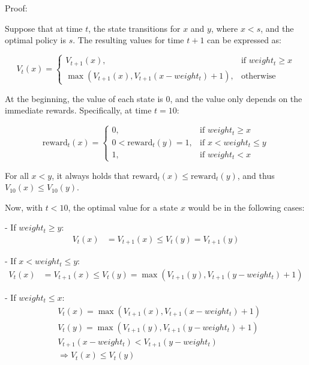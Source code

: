 Proof:

Suppose that at time $t$, the state transitions for $x$ and $y$, where $x < s$, and the optimal policy is $s$. The resulting values for time $t+1$ can be expressed as:

\begin{equation}
V_{t}(x) = 
\begin{cases}
V_{t+1}(x), & \text{if } weight_t \ge x \\
\max(V_{t+1}(x), V_{t+1}(x - weight_t) + 1), & \text{otherwise}
\end{cases}
\end{equation}

At the beginning, the value of each state is 0, and the value only depends on the immediate rewards. Specifically, at time $t=10$:

\begin{equation}
\text{reward}_{t}(x) = 
\begin{cases}
0, & \text{if } weight_t \ge x \\
0 < \text{reward}_{t}(y) = 1, & \text{if } x < weight_t \leq y \\
1, & \text{if } weight_t < x
\end{cases}
\end{equation}

For all $x < y$, it always holds that $\text{reward}_{t}(x) \leq \text{reward}_{t}(y)$, and thus $V_{10}(x) \leq V_{10}(y)$.

Now, with $t < 10$, the optimal value for a state $x$ would be in the following cases:

- If $weight_t \ge y$:
  \begin{align*}
  V_t(x) &= V_{t+1}(x) \leq V_{t}(y) = V_{t+1}(y)
  \end{align*}

- If $x < weight_t \leq y$:
  \begin{align*}
  V_t(x) &= V_{t+1}(x) \leq V_{t}(y) = \max(V_{t+1}(y), V_{t+1}(y - weight_t) + 1)
  \end{align*}

- If $weight_t \leq x$:
  \begin{align*}
  & V_t(x) = \max(V_{t+1}(x), V_{t+1}(x - weight_t) + 1) \\
  & V_{t}(y) = \max(V_{t+1}(y), V_{t+1}(y - weight_t) + 1) \\
  & V_{t+1}(x - weight_t) < V_{t+1}(y - weight_t) \\
  & \Rightarrow V_t(x) \leq V_t(y)
  \end{align*}

